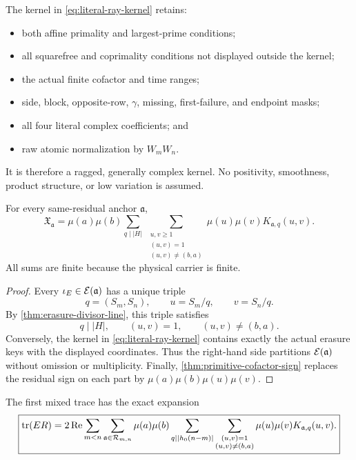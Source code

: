 The kernel in \eqref{eq:literal-ray-kernel} retains:
\begin{itemize}
 \item both affine primality and largest-prime conditions;
 \item all squarefree and coprimality conditions not displayed outside the
       kernel;
 \item the actual finite cofactor and time ranges;
 \item side, block, opposite-row, \(\gamma\), missing, first-failure, and
       endpoint masks;
 \item all four literal complex coefficients; and
 \item raw atomic normalization by \(W_mW_n\).
\end{itemize}
It is therefore a ragged, generally complex kernel.  No positivity,
smoothness, product structure, or low variation is assumed.

\begin{theorem}
\label{thm:primitive-plane-transform}
For every same-residual anchor \(\mathfrak a\),
\begin{equation}
\boxed{
 \mathfrak X_{\mathfrak a}
 =
 \mu(a)\mu(b)
 \sum_{q\mid |H|}
 \ \sum_{\substack{u,v\ge1\\(u,v)=1\\(u,v)\ne(b,a)}}
 \mu(u)\mu(v)K_{\mathfrak a,q}(u,v).}
\label{eq:primitive-plane-transform}
\end{equation}
All sums are finite because the physical carrier is finite.
\end{theorem}

\begin{proof}
Every \(\iota_E\in\mathcal E(\mathfrak a)\) has a unique triple
\[
 q=(S_m,S_n),\qquad u=S_m/q,\qquad v=S_n/q.
\]
By \cref{thm:erasure-divisor-line}, this triple satisfies
\[
 q\mid |H|,\qquad (u,v)=1,\qquad (u,v)\ne(b,a).
\]
Conversely, the kernel in \eqref{eq:literal-ray-kernel} contains exactly
the actual erasure keys with the displayed coordinates.  Thus the
right-hand side partitions \(\mathcal E(\mathfrak a)\) without omission or
multiplicity.  Finally, \cref{thm:primitive-cofactor-sign} replaces the
residual sign on each part by
\(\mu(a)\mu(b)\mu(u)\mu(v)\).
\end{proof}

\begin{corollary}
\label{cor:complete-rectangle-transform}
The first mixed trace has the exact expansion
\begin{equation}
\boxed{
\begin{aligned}
 \operatorname{tr}(ER)
 =2\operatorname{Re}
 \sum_{m<n}
 \sum_{\mathfrak a\in\mathcal R_{m,n}}
 \mu(a)\mu(b)
 \sum_{q\mid |h_0(n-m)|}
 \sum_{\substack{(u,v)=1\\(u,v)\ne(b,a)}}
 \mu(u)\mu(v)K_{\mathfrak a,q}(u,v).
\end{aligned}}
\label{eq:complete-primitive-plane-transform}
\end{equation}
\end{corollary}

